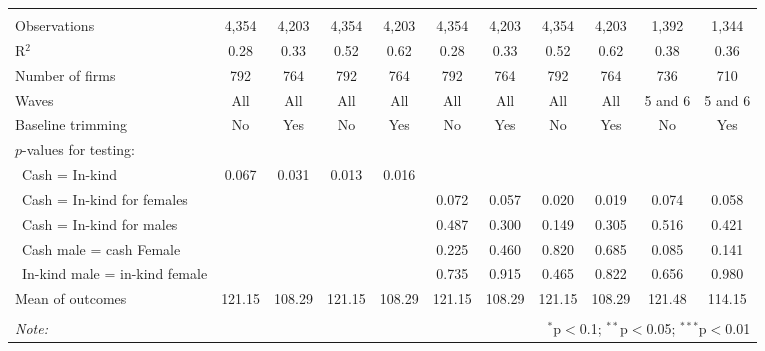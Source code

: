 \begin{table}[!htbp]
\begin{tabular}{@{\extracolsep{5pt}}lcccccccccc}
  & & & & & & & & & & \\ 
\hline \\[-1.8ex] 
Observations & 4,354 & 4,203 & 4,354 & 4,203 & 4,354 & 4,203 & 4,354 & 4,203 & 1,392 & 1,344 \\ 
R$^{2}$ & 0.28 & 0.33 & 0.52 & 0.62 & 0.28 & 0.33 & 0.52 & 0.62 & 0.38 & 0.36 \\ 
Number of firms & 792 & 764 & 792 & 764 & 792 & 764 & 792 & 764 & 736 & 710 \\ 
Waves & All & All & All & All & All & All & All & All & 5 and 6 & 5 and 6 \\ 
Baseline trimming & No & Yes & No & Yes & No & Yes & No & Yes & No & Yes \\ 
$p$-values for testing: &  &  &  &  &  &  &  &  &  &  \\ 
\  Cash = In-kind & 0.067 & 0.031 & 0.013 & 0.016 &  &  &  &  &  &  \\ 
\  Cash = In-kind for females &  &  &  &  & 0.072 & 0.057 & 0.020 & 0.019 & 0.074 & 0.058 \\ 
\  Cash = In-kind for males &  &  &  &  & 0.487 & 0.300 & 0.149 & 0.305 & 0.516 & 0.421 \\ 
\  Cash male = cash Female &  &  &  &  & 0.225 & 0.460 & 0.820 & 0.685 & 0.085 & 0.141 \\ 
\  In-kind male = in-kind female &  &  &  &  & 0.735 & 0.915 & 0.465 & 0.822 & 0.656 & 0.980 \\ 
Mean of outcomes & 121.15 & 108.29 & 121.15 & 108.29 & 121.15 & 108.29 & 121.15 & 108.29 & 121.48 & 114.15 \\ 
\hline \\[-1.8ex] 
\textit{Note:}  & \multicolumn{10}{r}{$^{*}$p$<$0.1; $^{**}$p$<$0.05; $^{***}$p$<$0.01} \\ 
\end{tabular} 
\end{table} 

